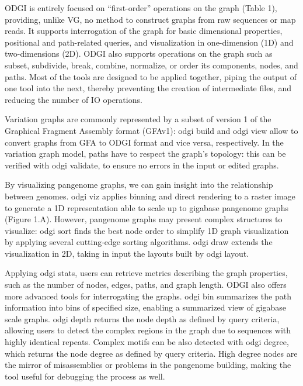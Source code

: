 \documentclass{bioinfo}
\begin{document}

ODGI is entirely focused on “first-order” operations on the graph (Table 1), providing, unlike VG, no method to construct graphs from raw sequences or map reads.
It supports interrogation of the graph for basic dimensional properties, positional and path-related queries, and visualization in one-dimension (1D) and two-dimensions (2D).
ODGI also supports operations on the graph such as subset, subdivide, break, combine, normalize, or order its components, nodes, and paths.
Most of the tools are designed to be applied together, piping the output of one tool into the next, thereby preventing the creation of intermediate files, and reducing the number of IO operations.


Variation graphs are commonly represented by a subset of version 1 of the Graphical Fragment Assembly format (GFAv1): odgi build and odgi view allow to convert graphs from GFA to ODGI format and vice versa, respectively.
In the variation graph model, paths have to respect the graph’s topology: this can be verified with odgi validate, to ensure no errors in the input or edited graphs.

By visualizing pangenome graphs, we can gain insight into the relationship between genomes.
odgi viz applies binning and direct rendering to a raster image to generate a 1D representation able to scale up to gigabase pangenome graphs (Figure 1.A).
However, pangenome graphs may present complex structures to visualize: odgi sort finds the best node order to simplify 1D graph visualization by applying several cutting-edge sorting algorithms.
odgi draw extends the visualization in 2D, taking in input the layouts built by odgi layout.

Applying odgi stats, users can retrieve metrics describing the graph properties, such as the number of nodes, edges, paths, and graph length.
ODGI also offers more advanced tools for interrogating the graphs. odgi bin summarizes the path information into bins of specified size, enabling a summarized view of gigabase scale graphs.
odgi depth returns the node depth as defined by query criteria, allowing users to detect the complex regions in the graph due to sequences with highly identical repeats.
Complex motifs can be also detected with odgi degree, which returns the node degree as defined by query criteria.
High degree nodes are the mirror of misassemblies or problems in the pangenome building, making the tool useful for debugging the process as well.
\end{document}
